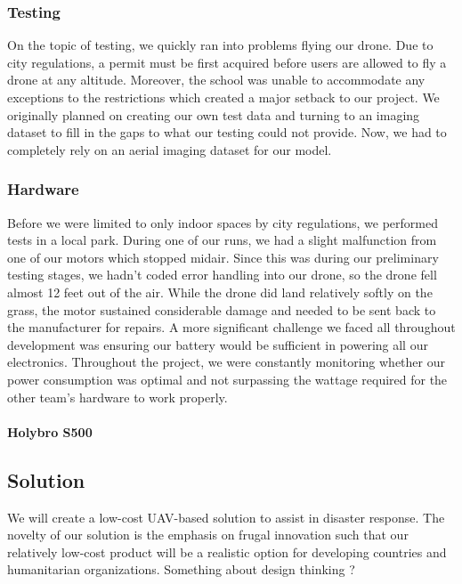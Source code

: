     \subsubsection{Testing}
    

On the topic of testing, we quickly ran into problems flying our drone. Due to city regulations, a permit must be first acquired before users are allowed to fly a drone at any altitude. Moreover, the school was unable to accommodate any exceptions to the restrictions which created a major setback to our project. We originally planned on creating our own test data and turning to an imaging dataset to fill in the gaps to what our testing could not provide. Now, we had to completely rely on an aerial imaging dataset for our model. 

    \subsubsection{Hardware}

Before we were limited to only indoor spaces by city regulations, we performed tests in a local park. During one of our runs, we had a slight malfunction from one of our motors which stopped midair. Since this was during our preliminary testing stages, we hadn’t coded error handling into our drone, so the drone fell almost 12 feet out of the air. While the drone did land relatively softly on the grass, the motor sustained considerable damage and needed to be sent back to the manufacturer for repairs. 
A more significant challenge we faced all throughout development was ensuring our battery would be sufficient in powering all our electronics. Throughout the project, we were constantly monitoring whether our power consumption was optimal and not surpassing the wattage required for the other team’s hardware to work properly. 


    \paragraph{Holybro S500}


\subsection{Solution}
We will create a low-cost UAV-based solution to assist in disaster response. The novelty of our solution is the emphasis on frugal innovation such that our relatively low-cost product will be a realistic option for developing countries and humanitarian organizations. Something about design thinking ? 


